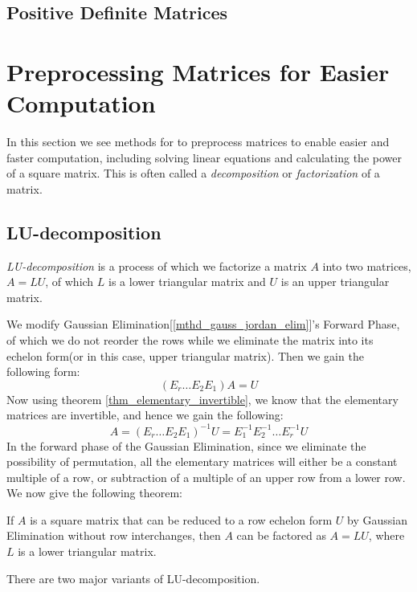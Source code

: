 \documentclass{report}
\begin{document}
		\subsection{Positive Definite Matrices}%
		
	
	\section{Preprocessing Matrices for Easier Computation}
	In this section we see methods for to preprocess matrices to enable easier and faster computation, including solving linear equations and calculating the power of a square matrix. This is often called a \emph{decomposition} or \emph{factorization} of a matrix.
	
		\subsection{LU-decomposition}
			\emph{LU-decomposition} is a process of which we factorize a matrix $A$ into two matrices, $A=LU$, of which $L$ is a lower triangular matrix and $U$ is an upper triangular matrix.
		
			We modify Gaussian Elimination[\ref{mthd_gauss_jordan_elim}]'s Forward Phase, of which we do not reorder the rows while we eliminate the matrix into its echelon form(or in this case, upper triangular matrix). Then we gain the following form:
			\begin{displaymath}
				(E_r\dots E_2E_1)A=U
			\end{displaymath}
			Now using theorem \ref{thm_elementary_invertible}, we know that the elementary matrices are invertible, and hence we gain the following:
			\begin{displaymath}
				A=(E_r\dots E_2E_1)^{-1}U=E_1^{-1}E_2^{-1}\dots E_r^{-1}U
			\end{displaymath}
			In the forward phase of the Gaussian Elimination, since we eliminate the possibility of permutation, all the elementary matrices will either be a constant multiple of a row, or subtraction of a multiple of an upper row from a lower row. We now give the following theorem:
			\begin{thm}
				If $A$ is a square matrix that can be reduced to a row echelon form $U$ by Gaussian Elimination without row interchanges, then $A$ can be factored as $A=LU$, where $L$ is a lower triangular matrix.
			\end{thm}
			
			There are two major variants of LU-decomposition.
			
\end{document}
